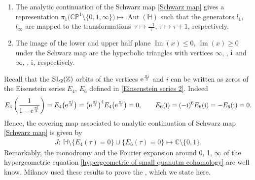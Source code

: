 \begin{Proposition}\label{Milanov lemma small 1}\quad
\begin{enumerate}\itemsep=0pt
\item[$(1)$]
The analytic continuation of the Schwarz map \eqref{Schwarz map} gives a representation
$\pi_1\bigl(\mathbb{CP}^1\setminus\{0,1,\infty\}\bigr)\mapsto \operatorname{Aut}(\mathbb{H})$
such that the generators $l_1$, $l_{\infty}$ are mapped to the transformations~${
\tau\mapsto \frac{-1}{\tau}}$, $ \tau\mapsto \tau+1$,
respectively.
\item[$(2)$] The image of the lower and upper half plane $\operatorname{Im}(x)\leq 0$, $\operatorname{Im}(x)\geq 0$ under the Schwarz map are the hyperbolic triangles with vertices $\infty$, , ${\rm i}$ and $\infty$, , ${\rm i}$, respectively.
\end{enumerate}
\end{Proposition}

Recall that the ${\rm SL}_2(\mathbb{Z})$ orbits of the vertices ${\rm e}^{\frac{\pi {\rm i}}{3}}$ and $i$ can be written as zeros of the Eisenstein series $E_4$, $E_6$ defined in \eqref{Einsenstein series 2}. Indeed
\begin{gather*}
E_4\left(\frac{1}{1-{\rm e}^{\frac{\pi {\rm i}}{3}} }\right)=E_4\bigl({\rm e}^{\frac{\pi {\rm i}}{3}}\bigr)=\bigl({\rm e}^{\frac{\pi {\rm i}}{3}}\bigr)^4E_4\bigl({\rm e}^{\frac{\pi {\rm i}}{3}}\bigr)=0,\qquad
E_6({\rm i})=(-{\rm i})^6E_6({\rm i})=-E_6({\rm i})=0.
\end{gather*}
Hence, the covering map associated to analytic continuation of Schwarz map \eqref{Schwarz map} is given by
\begin{gather}\label{function J covering definition}
J\colon\ \mathbb{H}\setminus\{E_4(\tau)=0\}\cup\{E_6(\tau)=0\}\mapsto \mathbb{C}\setminus\{0,1\}.
\end{gather}
Remarkably, the monodromy and the Fourier expansion around 0, 1, $\infty$ of the hypergeometric equation \eqref{hypergeometric of small quanutm cohomology} are well know. Milanov used these results to prove the \cite[Lemma 4.3]{Milanov}, which we state here.

